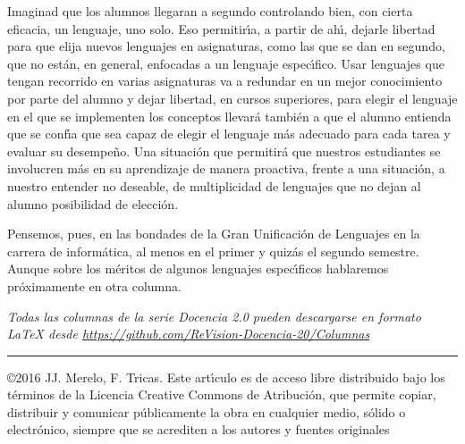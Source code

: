 \documentclass[twoside,10pt]{article}
\newcommand{\surl}[1]{{\small\url{#1}}}
\newcounter{vol}
\begin{document}
\begin{multicols}{2}
Imaginad que los alumnos llegaran a segundo controlando bien, con cierta
eficacia, un lenguaje, uno solo. Eso permitir\'{\i}a, a partir de ah\'{\i},
dejarle libertad para que elija nuevos lenguajes en asignaturas, como
las que se dan en segundo, que no est\'an, en general, enfocadas a un
lenguaje espec\'{\i}fico. Usar lenguajes que tengan recorrido en varias
asignaturas va a redundar en un mejor conocimiento por parte del alumno y
dejar libertad, en cursos superiores, para elegir el lenguaje en el
que se implementen los conceptos llevar\'a tambi\'en a que el alumno
entienda que se conf\'{\i}a que sea capaz de elegir el lenguaje m\'as
adecuado para cada tarea y evaluar su desempe\~{n}o. Una situaci\'on que
permitir\'a que nuestros estudiantes se involucren m\'as en su aprendizaje
de manera proactiva, frente a una situaci\'on, a nuestro entender no
deseable, de multiplicidad de lenguajes que no dejan al alumno posibilidad
de elecci\'on.

Pensemos, pues, en las bondades de la Gran Unificaci\'on de Lenguajes en
la carrera de inform\'atica, al menos en el primer y quiz\'as el segundo
semestre. 
Aunque sobre los m\'eritos de algunos lenguajes espec\'{\i}ficos hablaremos
pr\'oximamente en otra columna. 

\noindent  
\bigskip

\noindent\emph{Todas las columnas de la serie Docencia 2.0
pueden descargarse en formato LaTeX desde
\surl{https://github.com/ReVision-Docencia-20/Columnas}}

\noindent\rule{90mm}{1pt}

{\small \noindent\copyright 2016 JJ. Merelo, F. Tricas. Este art\'{\i}culo es de acceso libre distribuido bajo los t\'{e}rminos
de la Licencia Creative Commons de Atribuci\'{o}n, que permite copiar,
distribuir y comunicar p\'{u}blicamente la obra en cualquier medio, s\'{o}lido
o electr\'{o}nico, siempre que se acrediten a los autores y fuentes
originales}

\end{multicols}
\end{document}
